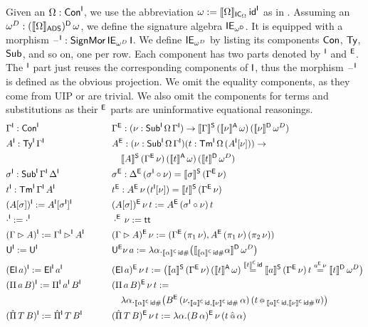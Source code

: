 \documentclass[a4paper,UKenglish,cleveref, autoref]{lipics-v2019}
\begin{document}
\begin{definition}
  Given an $\Omega:\mathsf{Con}^{\mathsf{I}}$, we use the abbreviation
  $\omega := \llbracket\Omega\rrbracket_{\mathsf{IC}_\Omega}\,\mathsf{id}^{\mathsf{I}}$ as in
  . Assuming an
  $\omega^D : (\llbracket\Omega\rrbracket_{\mathsf{ADS}})^{\mathsf{D}}\,\omega$, we define the
  signature algebra $\mathsf{IE}_{\omega^{\mathsf{D}}}$. It is equipped with a morphism
  $\mathord{\hspace{1pt}\text{--}\hspace{1pt}}^{\mathsf{I}} : \mathsf{SignMor}\,\mathsf{IE}_{\omega^D}\,\mathsf{I}$. We define
  $\mathsf{IE}_{\omega^D}$ by listing its components $\mathsf{Con}$, $\mathsf{Ty}$, $\mathsf{Sub}$,
  and so on, one per row. Each component has two parts denoted by
  $^{\mathsf{I}}$ and $^{\mathsf{E}}$. The $^{\mathsf{I}}$ part just reuses the corresponding
  components of $\mathsf{I}$, thus the morphism $\mathord{\hspace{1pt}\text{--}\hspace{1pt}}^{\mathsf{I}}$ is defined as the
  obvious projection. We omit the equality components, as they come
  from UIP or are trivial. We also omit the components for terms and
  substitutions as their $^{\mathsf{E}}$ parts are uninformative equational
  reasonings.
  \begin{alignat*}{10}
    & \Gamma^\I:\Con^\I && \hspace{1em} && \Gamma^\E:(\nu:\Sub^\I\,\Omega\,\Gamma^\I)\ra \ll\Gamma\rr^\S\,(\ll\nu\rr^\A\,\omega)\,(\ll\nu\rr^\D\,\omega^D) \\
    & A^\I:\Ty^\I\,\Gamma^\I && && A^\E:(\nu:\Sub^\I\,\Omega\,\Gamma^\I)(t:\Tm^\I\,\Omega\,(A^\I[\nu]))\ra \\
    & && && \hspace{1em} \ll A\rr^\S\,(\Gamma^\E\,\nu)\,(\ll t\rr^\A\,\omega)\,(\ll t\rr^\D\,\omega^D) \\
    & \sigma^\I:\Sub^\I\,\Gamma^\I\,\Delta^\I && && \sigma^\E:\Delta^\E\,(\sigma^\I\circ\nu)=\ll\sigma\rr^\S\,(\Gamma^\E\,\nu) \\
    & t^\I:\Tm^\I\,\Gamma^\I\,A^\I && && t^\E : A^\E\,\nu\,(t^\I[\nu])= \ll t\rr^\S\,(\Gamma^\E\,\nu) \\
    & (A[\sigma])^\I := A^\I[\sigma^\I]^\I && && (A[\sigma])^\E\,\nu\,t := A^\E\,(\sigma^\I\circ\nu)\,t \\
    & \cdot^\I := \cdot^\I && && \cdot^\E\,\nu := \tt \\
    & (\Gamma\rhd A)^\I := \Gamma^\I\rhd^\I A^\I && && (\Gamma\rhd A)^\E\,\nu := (\Gamma^\E\,(\pi_1\,\nu), A^\E\,(\pi_1\,\nu)\,(\pi_2\,\nu)) \\
    & \U^\I := \U^\I && && \U^\E\nu\,a := \lambda\alpha . _{\ll\alpha\rr^\C\,\id\#}\big(\ll_{\ll\alpha\rr^\C\,\id\#}\alpha\rr^\D\,\omega^D\big) \\
    & (\El\,a)^\I := \El^\I\,a^\I && && (\El\,a)^\E\,\nu\,t := \big(\ll a\rr^\S\,(\Gamma^\E\,\nu)\,(\ll t\rr^\A\,\omega) \overset{\ll t\rr^\C\,\id}{=} \ll a\rr^\S\,(\Gamma^\E\,\nu)\,t \overset{a^\E\,\nu}{=} \ll t\rr^\D\,\omega^D\big) \\
    & (\Pi\,a\,B)^\I := \Pi^\I\,a^\I\,B^\I && && (\Pi\,a\,B)^\E\,\nu\,t := \\
    & && && \hspace{1em} \lambda\alpha.{_{\ll\alpha\rr^\C\,\id\#}}\big(B^\E\,(\nu,_{\ll a\rr^\C\,\id,\ll\nu\rr^\C\,\id\#}\alpha)\,(t\oldapp {_{\ll a\rr^\C\,\id,\ll\nu\rr^\C\,\id\#}u})\big) \\
    & (\Pim\,T\,B)^\I := \Pim^\I\,T\,B^\I && && (\Pim\,T\,B)^\E\,\nu\,t := \lambda\alpha.(B\,\alpha)^\E\,\nu\,(t\appm\alpha)
  \end{alignat*}
\end{definition}
\end{document}

